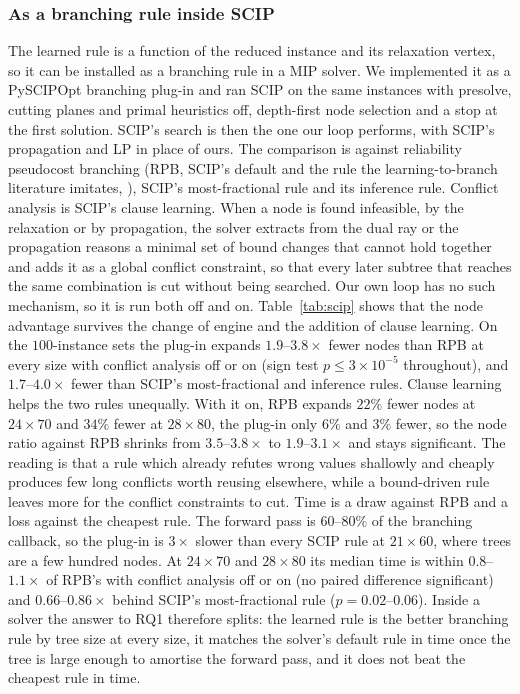 \documentclass[final,5p,times,twocolumn,authoryear]{elsarticle}
\begin{document}
\subsubsection{As a branching rule inside SCIP}
The learned rule is a function of the reduced instance and its relaxation vertex, so it can be installed as a branching rule in a MIP solver. We implemented it as a PySCIPOpt branching plug-in and ran SCIP \citep{bestuzheva2021scip} on the same instances with presolve, cutting planes and primal heuristics off, depth-first node selection and a stop at the first solution. SCIP's search is then the one our loop performs, with SCIP's propagation and LP in place of ours. The comparison is against reliability pseudocost branching (RPB, SCIP's default and the rule the learning-to-branch literature imitates, \citealp{achterberg2005branching}), SCIP's most-fractional rule and its inference rule. Conflict analysis is SCIP's clause learning. When a node is found infeasible, by the relaxation or by propagation, the solver extracts from the dual ray or the propagation reasons a minimal set of bound changes that cannot hold together and adds it as a global conflict constraint, so that every later subtree that reaches the same combination is cut without being searched. Our own loop has no such mechanism, so it is run both off and on.
Table~\ref{tab:scip} shows that the node advantage survives the change of engine and the addition of clause learning. On the $100$-instance sets the plug-in expands $1.9$--$3.8\times$ fewer nodes than RPB at every size with conflict analysis off or on (sign test $p\le3\times10^{-5}$ throughout), and $1.7$--$4.0\times$ fewer than SCIP's most-fractional and inference rules. Clause learning helps the two rules unequally. With it on, RPB expands $22\%$ fewer nodes at $24\times70$ and $34\%$ fewer at $28\times80$, the plug-in only $6\%$ and $3\%$ fewer, so the node ratio against RPB shrinks from $3.5$--$3.8\times$ to $1.9$--$3.1\times$ and stays significant. The reading is that a rule which already refutes wrong values shallowly and cheaply produces few long conflicts worth reusing elsewhere, while a bound-driven rule leaves more for the conflict constraints to cut. Time is a draw against RPB and a loss against the cheapest rule. The forward pass is $60$--$80\%$ of the branching callback, so the plug-in is $3\times$ slower than every SCIP rule at $21\times60$, where trees are a few hundred nodes. At $24\times70$ and $28\times80$ its median time is within $0.8$--$1.1\times$ of RPB's with conflict analysis off or on (no paired difference significant) and $0.66$--$0.86\times$ behind SCIP's most-fractional rule ($p=0.02$--$0.06$). Inside a solver the answer to RQ1 therefore splits: the learned rule is the better branching rule by tree size at every size, it matches the solver's default rule in time once the tree is large enough to amortise the forward pass, and it does not beat the cheapest rule in time.
\end{document}
